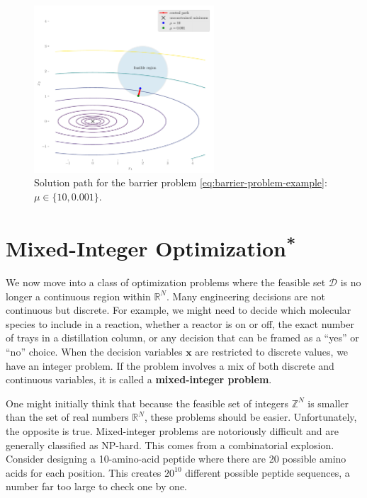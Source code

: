 \begin{exampleBox}
    \begin{figure}[H]
        \centering
        \includegraphics[width=0.6\textwidth]{figs/optimization/barrier_example.pdf}
        \caption{Solution path for the barrier problem \autoref{eq:barrier-problem-example}: $\mu\in\{10,0.001\}$.}
        \label{fig:barrier-example}
    \end{figure}

\end{exampleBox}


\section{\texorpdfstring{Mixed-Integer Optimization\textsuperscript{*}}{Mixed-Integer Optimization}}
\label{sec:mixed-integer-optimization}

We now move into a class of optimization problems where the feasible set $\mathcal{D}$ is no longer a continuous region within $\mathbb{R}^N$. Many engineering decisions are not continuous but discrete. For example, we might need to decide which molecular species to include in a reaction, whether a reactor is on or off, the exact number of trays in a distillation column, or any decision that can be framed as a ``yes'' or ``no'' choice. When the decision variables $\mathbf{x}$ are restricted to discrete values, we have an integer problem. If the problem involves a mix of both discrete and continuous variables, it is called a \textbf{mixed-integer problem}.

One might initially think that because the feasible set of integers $\mathbb{Z}^N$ is smaller than the set of real numbers $\mathbb{R}^N$, these problems should be easier. Unfortunately, the opposite is true. Mixed-integer problems are notoriously difficult and are generally classified as NP-hard. This comes from a combinatorial explosion. Consider designing a 10-amino-acid peptide where there are 20 possible amino acids for each position. This creates $20^{10}$ different possible peptide sequences, a number far too large to check one by one.


